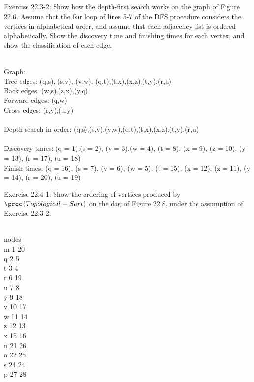 \documentclass[addpoints,11pt]{exam}
\begin{document}
\begin{questions}
\begin{solutionorbox}
\end{solutionorbox}

\ifprintanswers
\newpage
\else
\bigskip
\fi



\question[5]
Exercise 22.3-2:  Show how the depth-first search works on the graph of Figure 22.6.  Assume that the \textbf{for} loop of lines 5-7 of the DFS procedure considers the vertices in alphabetical order, and assume that each adjacency list is ordered alphabetically.  Show the discovery time and finishing times for each vertex, and show the classification of each edge.
\begin{solutionorbox}
\\
Graph:\\
Tree edges: (q,s), (s,v), (v,w), (q,t),(t,x),(x,z),(t,y),(r,u)\\
Back edges: (w,s),(z,x),(y,q)\\
Forward edges: (q,w)\\
Cross edges: (r,y),(u,y)\\
\\
Depth-search in order: (q,s),(s,v),(v,w),(q,t),(t,x),(x,z),(t,y),(r,u)\\ 
\\
Discovery times: (q = 1),(s = 2), (v = 3),(w = 4), (t = 8), (x = 9), (z = 10),
(y = 13), (r = 17), (u = 18)\\
Finish times: (q = 16), (s = 7), (v = 6), (w = 5), (t = 15), (x = 12), (z = 11),
(y = 14), (r = 20), (u = 19)\\
\end{solutionorbox}

\ifprintanswers
\newpage
\else
\bigskip
\fi



\question[5]
Exercise 22.4-1: Show the ordering of vertices produced by $\proc{Topological-Sort}$ on the dag of Figure 22.8, under the assumption of Exercise 22.3-2.  
\begin{solutionorbox}
	\\
nodes \\
m	1	20\\
q	2	5\\
t	3	4\\
r	6	19\\
u	7	8\\
y	9	18\\
v	10	17\\
w	11	14\\
z	12	13\\
x	15	16\\
n	21	26\\
o	22	25\\
s	24	24\\
p	27	28\\



\end{solutionorbox}
\end{questions}
\end{document}
